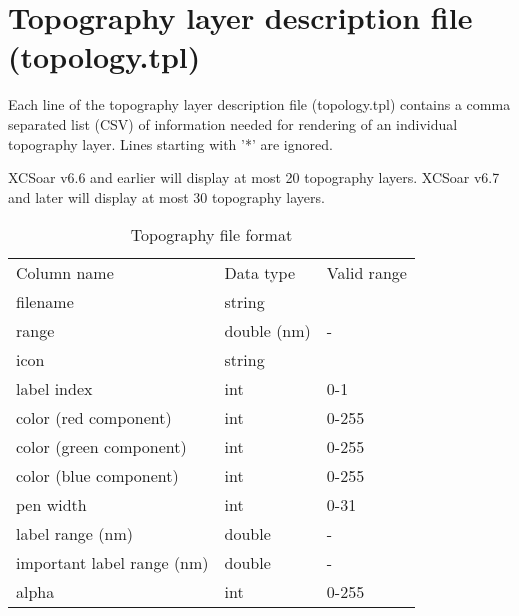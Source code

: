 \section{Topography layer description file (topology.tpl)}

Each line of the topography layer description file (topology.tpl) contains
a comma separated list (CSV) of information needed for rendering of an
individual topography layer. Lines starting with '*' are ignored.

XCSoar v6.6 and earlier will display at most 20 topography layers.
XCSoar v6.7 and later will display at most 30 topography layers.
\begin{table}[ht]
\centering
\sffamily
\begin{tabular}{@{}lll@{}}
\toprule
\addlinespace
Column name&Data type&Valid range\\
\cmidrule(r){1-1}\cmidrule(lr){2-2}\cmidrule(l){3-3}
filename&string&\\
range&double (nm)&-\\
icon&string&\\
label index&int&0-1\\
color (red component)&int&0-255\\
color (green component)&int&0-255\\
color (blue component)&int&0-255\\
pen width&int&0-31\\
label range (nm)&double&-\\
important label range (nm)&double&-\\
alpha&int&0-255\\
\bottomrule
\end{tabular}
\caption{Topography file format}
\label{tab:topography-file-format}
\end{table}

